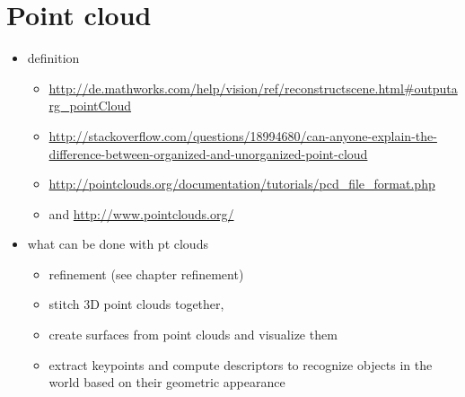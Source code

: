 \section{Point cloud}


\begin{itemize}
\item definition
\begin{itemize}
	\item \url{http://de.mathworks.com/help/vision/ref/reconstructscene.html#outputarg_pointCloud}
	\item \url{http://stackoverflow.com/questions/18994680/can-anyone-explain-the-difference-between-organized-and-unorganized-point-cloud}
	\item \url{http://pointclouds.org/documentation/tutorials/pcd_file_format.php}
	\item \cite{Rusu.2011} and \url{http://www.pointclouds.org/}
\end{itemize}
\item what can be done with pt clouds
\begin{itemize}
	\item refinement (see chapter refinement)
	\item stitch 3D point clouds together, 
	\item create surfaces from point clouds and visualize them
	\item extract keypoints and compute descriptors to recognize objects in the world based on their geometric appearance
\end{itemize}


\end{itemize}


